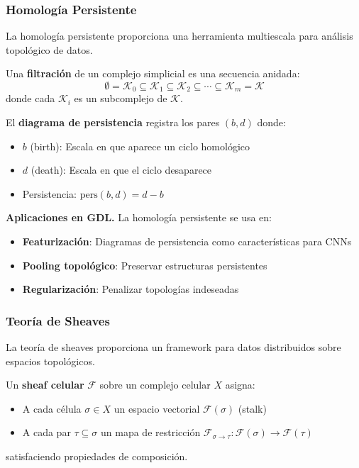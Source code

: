 \subsubsection{Homología Persistente}

La homología persistente proporciona una herramienta multiescala para análisis topológico de datos.

\begin{definition}[Filtración]\label{def:filtracion_cnn}
Una \textbf{filtración} de un complejo simplicial es una secuencia anidada:
\[\emptyset = \mathcal{K}_0 \subseteq \mathcal{K}_1 \subseteq \mathcal{K}_2 \subseteq \cdots \subseteq \mathcal{K}_m = \mathcal{K}\]
donde cada $\mathcal{K}_i$ es un subcomplejo de $\mathcal{K}$.
\end{definition}

\begin{definition}\label{def:diagrama_persistencia_cnn}
El \textbf{diagrama de persistencia} registra los pares $(b, d)$ donde:
\begin{itemize}
    \item $b$ (birth): Escala en que aparece un ciclo homológico
    \item $d$ (death): Escala en que el ciclo desaparece
    \item Persistencia: $\text{pers}(b,d) = d - b$
\end{itemize}
\end{definition}

\textbf{Aplicaciones en GDL.}\label{rem:persistencia_gdl} La homología persistente se usa en:
\begin{itemize}
    \item \textbf{Featurización}: Diagramas de persistencia como características para CNNs
    \item \textbf{Pooling topológico}: Preservar estructuras persistentes
    \item \textbf{Regularización}: Penalizar topologías indeseadas
\end{itemize}

\subsubsection{Teoría de Sheaves}

La teoría de sheaves proporciona un framework para datos distribuidos sobre espacios topológicos.

\begin{definition}\label{def:sheaf_celular}
Un \textbf{sheaf celular} $\mathcal{F}$ sobre un complejo celular $X$ asigna:
\begin{itemize}
    \item A cada célula $\sigma \in X$ un espacio vectorial $\mathcal{F}(\sigma)$ (stalk)
    \item A cada par $\tau \subseteq \sigma$ un mapa de restricción $\mathcal{F}_{\sigma \to \tau}: \mathcal{F}(\sigma) \to \mathcal{F}(\tau)$
\end{itemize}
satisfaciendo propiedades de composición.
\end{definition}

